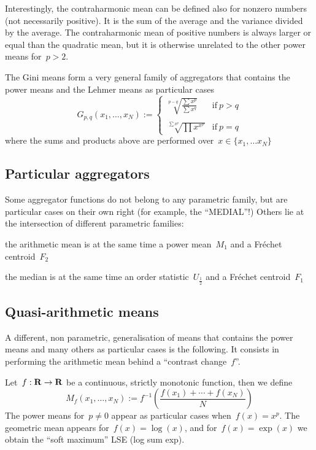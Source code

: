 \medskip

Interestingly, the contraharmonic mean can be defined also for
nonzero numbers (not necessarily positive).
It is the sum of the average and the variance divided by the average.
The contraharmonic mean of positive numbers is always larger or
equal than the quadratic mean, but it is otherwise unrelated to the
other power means for~$p>2$.

The Gini means form a very general family of aggregators that
contains the power means and the Lehmer means as particular cases
\[
	G_{p,q}(x_1,\ldots,x_N) :=
	\begin{cases}
		\sqrt[p-q]{\displaystyle\frac{\sum x^p}{\sum x^q}}
		& \textrm{if}\ p>q \\
		&\\
		\sqrt[\sum x^p]{\prod x^{x^p}}
		& \textrm{if}\ p=q
	\end{cases}
\]
where the sums and products above are performed over~$x\in\{x_1,\ldots
x_N\}$

\subsection{Particular aggregators}

Some aggregator functions do not belong to any parametric family, but
are particular cases on their own right
(for example, the ``MEDIAL''!) Others lie at the
intersection of different parametric families:

the arithmetic mean is at the same time a power mean~$M_1$ and a
Fréchet centroid~$F_2$

the median is at the same time an order statistic~$U_{\frac{1}{2}}$ and a
Fréchet centroid~$F_1$


\subsection{Quasi-arithmetic means}

A different, non parametric, generalisation of means that contains
the power means and many others as particular cases is the following.
It consists in performing the arithmetic mean behind a ``contrast
change~$f$''.

Let~$f:\mathbf{R}\to\mathbf{R}$ be a continuous, strictly monotonic function, then we
define
\[
	M_f(x_1,\ldots,x_N):=f^{-1}\left(\frac{f(x_1)+\cdots+f(x_N)}{N}\right)
\]
The power means for~$p\neq0$  appear as particular cases
when~$f(x)=x^p$.  The geometric mean appears for~$f(x)=\log(x)$, and
for~$f(x)=\exp(x)$ we obtain the ``soft maximum'' LSE (log sum exp).


